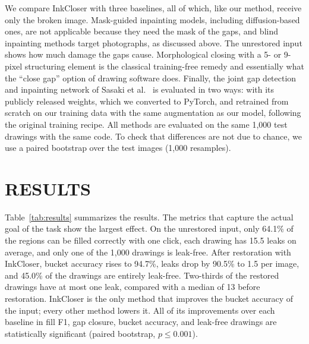 \documentclass{IEEEcsmag}
\providecommand{\DIFaddtex}[1]{{\color{blue}#1}} %
\providecommand{\DIFaddbegin}{} %
\providecommand{\DIFaddend}{} %
\providecommand{\DIFaddtex}[1]{\DIFaddtex{#1}} %
\providecommand{\DIFaddbegin}{} %
\providecommand{\DIFadd}[1]{\texorpdfstring{\DIFaddtex{#1}}{#1}} %
\begin{document}
We compare InkCloser with three baselines, all of which, like our method, receive
only the broken image. \DIFaddbegin \DIFadd{Mask-guided inpainting models, including diffusion-based ones,
are not applicable because they need the mask of the gaps, and blind inpainting
methods target photographs, as discussed above. }\DIFaddend The unrestored input shows how much damage the gaps cause.
Morphological closing with a 5- or 9-pixel structuring element is the classical
training-free remedy and essentially what the ``close gap'' option of drawing software
does. Finally, the joint gap detection and inpainting network of Sasaki et
al.~\cite{sasaki2017joint} is evaluated in two ways: with its publicly released
weights, which we converted to PyTorch, and retrained from scratch on our training
data with the same augmentation as our model, following the original training
recipe. All methods are evaluated on the same 1,000 test drawings with the same code.
To check that differences are not due to chance, we use a paired bootstrap over the
test images \DIFaddbegin \DIFadd{(1,000 resamples)}\DIFaddend .

\section{RESULTS}

Table~\ref{tab:results} summarizes the results. The metrics that capture the actual
goal of the task show the largest effect. On the unrestored input, only 64.1\% of the
regions can be filled correctly with one click, each drawing has 15.5 leaks on
average, and only one of the 1,000 drawings is leak-free. After restoration with
InkCloser, bucket accuracy rises to 94.7\%, leaks drop by 90.5\% to 1.5 per image, and
45.0\% of the drawings are entirely leak-free. Two-thirds of the restored drawings
have at most one leak, compared with a median of 13 before restoration. InkCloser is
the only method that improves the bucket accuracy of the input; every other method
lowers it. All of its improvements over each baseline in fill F1, gap closure, bucket
accuracy, and leak-free drawings are statistically significant (paired bootstrap,
$p\le 0.001$).
\end{document}
